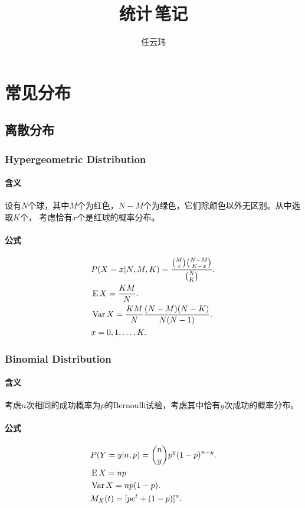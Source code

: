 

\title{统计$\,$笔记}
\author{任云玮}
\date{}


\maketitle
\tableofcontents

\newpage
\section{常见分布}
\subsection{离散分布}
  \subsubsection{Hypergeometric Distribution}
    \paragraph{含义}
      设有$N$个球，其中$M$个为红色，$N-M$个为绿色，它们除颜色以外无区别。从中选取$K$个，
      考虑恰有$x$个是红球的概率分布。
    \paragraph{公式}
      \begin{align*}
        &P(X=x|N,M,K) = \frac{\binom{M}{x}\binom{N-M}{K-x}}{\binom{N}{K}}.\\
        &\operatorname{E} X = \frac{KM}{N}. \\
        &\operatorname{Var} X = \frac{KM}{N}\frac{(N-M)(N-K)}{N(N-1)}.\\
        &x = 0,1,\dots,K.
      \end{align*}
  \subsubsection{Binomial Distribution}
    \paragraph{含义}
    考虑$n$次相同的成功概率为$p$的Bernoulli试验，考虑其中恰有$y$次成功的概率分布。
    \paragraph{公式}
    \begin{align*}
      & P(Y=y|n,p)=\binom{n}{y}p^y(1-p)^{n-y}. \\
      & \operatorname{E} X = np \\
      & \operatorname{Var} X = np(1-p). \\
      & M_X(t) = [pe^t + (1-p)]^n.
    \end{align*}

